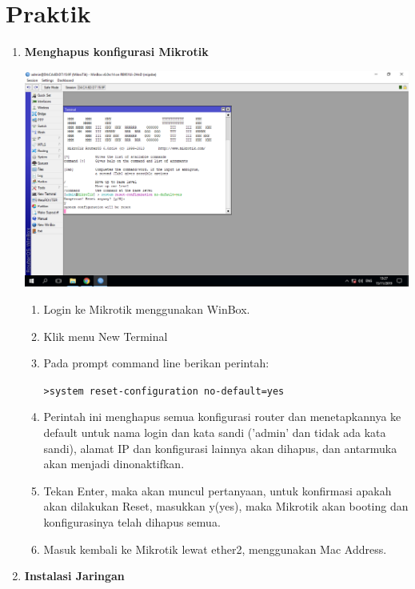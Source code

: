 \documentclass[a4paper,12pt]{article}
\begin{document}
\section{Praktik}
\begin{enumerate}
	\item {\bfseries Menghapus konfigurasi Mikrotik
}
	\begin{center}
	\includegraphics[scale=.4]{Page-1-Image-1}
	\end{center}	
	\begin{enumerate}[label=\alph*.]
		\item Login ke Mikrotik menggunakan WinBox.
		
		\item Klik menu New Terminal
		
		\item Pada prompt command line berikan perintah:
		
		\texttt{>system reset-configuration no-default=yes}
		
		\item Perintah ini menghapus semua konfigurasi router dan menetapkannya ke default untuk nama login dan kata sandi ('admin' dan tidak ada kata sandi), alamat IP dan konfigurasi lainnya akan dihapus, dan antarmuka akan menjadi dinonaktifkan.
		
		\item Tekan Enter, maka akan muncul pertanyaan, untuk konfirmasi apakah akan dilakukan Reset, masukkan y(yes), maka Mikrotik akan booting dan konfigurasinya telah dihapus semua.
		
		\item Masuk kembali ke Mikrotik lewat ether2, menggunakan Mac Address.
		
	\end{enumerate}
	
	\item {\bfseries Instalasi Jaringan}
	
\end{enumerate}
\end{document}
